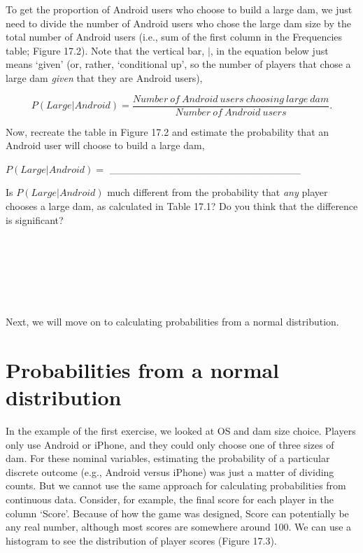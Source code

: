 \documentclass[
  openany]{scrbook}
\begin{document}
To get the proportion of Android users who choose to build a large dam, we just need to divide the number of Android users who chose the large dam size by the total number of Android users (i.e., sum of the first column in the Frequencies table; Figure 17.2).
Note that the vertical bar, \(|\), in the equation below just means `given' (or, rather, `conditional up', so the number of players that chose a large dam \emph{given} that they are Android users),

\[P(Large | Android) = \frac{Number\:of\:Android\:users\:choosing\:large\:dam}{Number\:of\:Android\:users}.\]

Now, recreate the table in Figure 17.2 and estimate the probability that an Android user will choose to build a large dam,

\(P(Large | Android) =\) \_\_\_\_\_\_\_\_\_\_\_\_\_\_\_\_\_\_\_\_\_\_\_\_\_\_

Is \(P(Large | Android)\) much different from the probability that \emph{any} player chooses a large dam, as calculated in Table 17.1? Do you think that the difference is significant?

\begin{verbatim}






\end{verbatim}

Next, we will move on to calculating probabilities from a normal distribution.

\hypertarget{probabilities-from-a-normal-distribution}{%
\section{Probabilities from a normal distribution}\label{probabilities-from-a-normal-distribution}}

In the example of the first exercise, we looked at OS and dam size choice.
Players only use Android or iPhone, and they could only choose one of three sizes of dam.
For these nominal variables, estimating the probability of a particular discrete outcome (e.g., Android versus iPhone) was just a matter of dividing counts.
But we cannot use the same approach for calculating probabilities from continuous data.
Consider, for example, the final score for each player in the column `Score'.
Because of how the game was designed, Score can potentially be any real number, although most scores are somewhere around 100.
We can use a histogram to see the distribution of player scores (Figure 17.3).
\end{document}
